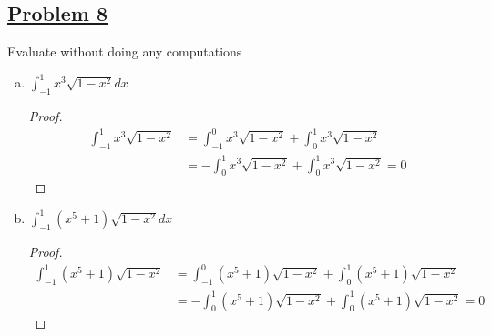 \documentclass[10pt,letterpaper]{article}
\begin{document}
	\subsection*{{\color{purple}\underline{Problem 8}}}
	Evaluate without doing any computations
	\begin{enumerate}[(a)]
		\item $\displaystyle\int_{-1}^{1} x^3 \sqrt{1 - x^2} dx$
		\begin{proof}
	\begin{align*}
		\displaystyle\int_{-1}^{1} x^3 \sqrt{1 - x^2} 
		&= \displaystyle\int_{-1}^{0} x^3 \sqrt{1 - x^2} + \displaystyle\int_{0}^{1} x^3 \sqrt{1 - x^2} \\
		&= -\displaystyle\int_{0}^{1} x^3 \sqrt{1 - x^2} + \displaystyle\int_{0}^{1} x^3 \sqrt{1 - x^2} = 0
	\end{align*}
		\end{proof}
		
		\item $\displaystyle\int_{-1}^{1} (x^5  + 1)\sqrt{1 - x^2} dx$
		\begin{proof}
		\begin{align*}
		\displaystyle\int_{-1}^{1} (x^5  + 1)\sqrt{1 - x^2} 
		&= \displaystyle\int_{-1}^{0} (x^5  + 1)\sqrt{1 - x^2} + \displaystyle\int_{0}^{1} (x^5  + 1)\sqrt{1 - x^2} \\
		&= -\displaystyle\int_{0}^{1} (x^5  + 1)\sqrt{1 - x^2} + \displaystyle\int_{0}^{1} (x^5  + 1)\sqrt{1 - x^2} = 0
		\end{align*}
		\end{proof}
	\end{enumerate}
	
	
\end{document}
